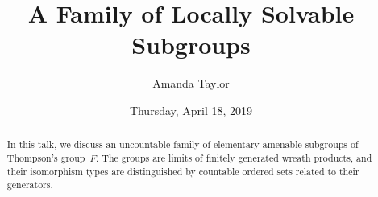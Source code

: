 \documentclass{UAmathtalk}
\author{Amanda Taylor}
\title{A Family of Locally Solvable Subgroups}
\date{Thursday, April 18, 2019}
\begin{document}
\maketitle

\begin{abstract}
In this talk, we discuss an uncountable family of elementary amenable subgroups of Thompson’s group~$F$. The groups are limits of finitely generated wreath products, and their isomorphism types are distinguished by countable ordered sets related to their generators.
\end{abstract}
\end{document}
